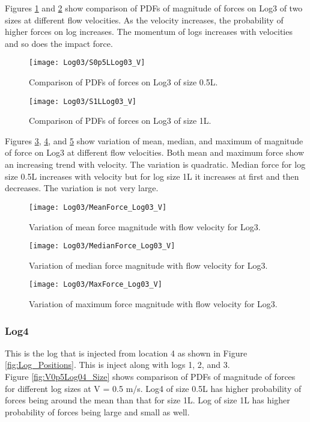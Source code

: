 \noindent Figures \ref{fig:S0p5LLog03_V} and \ref{fig:S1LLog03_V} show comparison of PDFs of magnitude of forces on Log3 of two sizes at different flow velocities. As the velocity increases, the probability of higher forces on log increases. The momentum of logs increases with velocities and so does the impact force.

\begin{figure}
\centering
\texttt{[image: Log03/S0p5LLog03\_V]}
\caption{\label{fig:S0p5LLog03_V}Comparison of PDFs of forces on Log3 of size 0.5L.}
\end{figure}
\begin{figure}
\centering
\texttt{[image: Log03/S1LLog03\_V]}
\caption{\label{fig:S1LLog03_V}Comparison of PDFs of forces on Log3 of size 1L.}
\end{figure}

\noindent Figures \ref{fig:MeanForce_Log03_V}, \ref{fig:MedianForce_Log03_V}, and \ref{fig:MaxForce_Log03_V} show variation of mean, median, and maximum of magnitude of force on Log3 at different flow velocities. Both mean and maximum force show an increasing trend with velocity. The variation is quadratic. Median force for log size 0.5L increases with velocity but for log size 1L it increases at first and then decreases. The variation is not very large.

\begin{figure}
\centering
\texttt{[image: Log03/MeanForce\_Log03\_V]}
\caption{\label{fig:MeanForce_Log03_V}Variation of mean force magnitude with flow velocity for Log3.}
\end{figure}
\begin{figure}
\centering
\texttt{[image: Log03/MedianForce\_Log03\_V]}
\caption{\label{fig:MedianForce_Log03_V}Variation of median force magnitude with flow velocity for Log3.}
\end{figure}
\begin{figure}
\centering
\texttt{[image: Log03/MaxForce\_Log03\_V]}
\caption{\label{fig:MaxForce_Log03_V}Variation of maximum force magnitude with flow velocity for Log3.}
\end{figure}

\FloatBarrier
\subsubsection{Log4}
This is the log that is injected from location 4 as shown in Figure \ref{fig:Log_Positions}. This is inject along with logs 1, 2, and 3.\\ 
Figure \ref{fig:V0p5Log04_Size} shows comparison of PDFs of magnitude of forces for different log sizes at V = 0.5 m/s. Log4 of size 0.5L has higher probability of forces being around the mean than that for size 1L. Log of size 1L has higher probability of forces being large and small as well.


